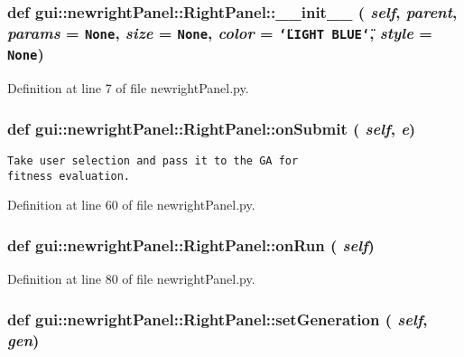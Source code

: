 \subsubsection{\setlength{\rightskip}{0pt plus 5cm}def gui::newrightPanel::RightPanel::\_\-\_\-init\_\-\_\- ( {\em self},  {\em parent},  {\em params} = {\tt None},  {\em size} = {\tt None},  {\em color} = {\tt \char`\"{}LIGHT~BLUE\char`\"{}},  {\em style} = {\tt None})}\label{classgui_1_1newrightPanel_1_1RightPanel_bc3c362aa77bc0a3b5bbc3bd6b165524}




Definition at line 7 of file newrightPanel.py.
\subsubsection{\setlength{\rightskip}{0pt plus 5cm}def gui::newrightPanel::RightPanel::onSubmit ( {\em self},  {\em e})}\label{classgui_1_1newrightPanel_1_1RightPanel_f874657e85ef7e061672d99ddd3fdea0}




\footnotesize\begin{verbatim}
Take user selection and pass it to the GA for 
fitness evaluation.
\end{verbatim}
\normalsize
 

Definition at line 60 of file newrightPanel.py.
\subsubsection{\setlength{\rightskip}{0pt plus 5cm}def gui::newrightPanel::RightPanel::onRun ( {\em self})}\label{classgui_1_1newrightPanel_1_1RightPanel_496c78ac67e4d106640d403571456e36}




Definition at line 80 of file newrightPanel.py.
\subsubsection{\setlength{\rightskip}{0pt plus 5cm}def gui::newrightPanel::RightPanel::setGeneration ( {\em self},  {\em gen})}\label{classgui_1_1newrightPanel_1_1RightPanel_52dbb4f7b57e8f8b0f87c9d74c0094fb}




